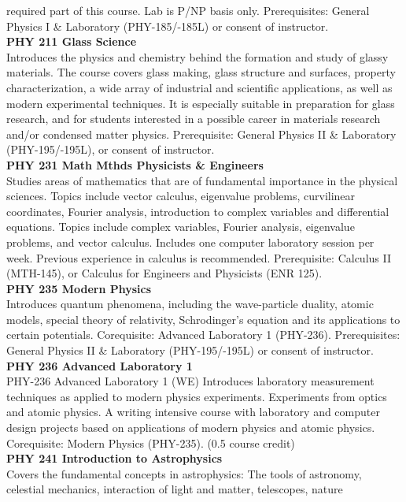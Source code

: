 \documentclass[
  letterpaper,
]{scrbook}
\begin{document}
required part of this course. Lab is P/NP basis only. Prerequisites:
General Physics I \& Laboratory (PHY-185/-185L) or consent of
instructor.\\
\textbf{PHY 211 Glass Science}\\
Introduces the physics and chemistry behind the formation and study of
glassy materials. The course covers glass making, glass structure and
surfaces, property characterization, a wide array of industrial and
scientific applications, as well as modern experimental techniques. It
is especially suitable in preparation for glass research, and for
students interested in a possible career in materials research and/or
condensed matter physics. Prerequisite: General Physics II \& Laboratory
(PHY-195/-195L), or consent of instructor.\\
\textbf{PHY 231 Math Mthds Physicists \& Engineers}\\
Studies areas of mathematics that are of fundamental importance in the
physical sciences. Topics include vector calculus, eigenvalue problems,
curvilinear coordinates, Fourier analysis, introduction to complex
variables and differential equations. Topics include complex variables,
Fourier analysis, eigenvalue problems, and vector calculus. Includes one
computer laboratory session per week. Previous experience in calculus is
recommended. Prerequisite: Calculus II (MTH-145), or Calculus for
Engineers and Physicists (ENR 125).\\
\textbf{PHY 235 Modern Physics}\\
Introduces quantum phenomena, including the wave-particle duality,
atomic models, special theory of relativity, Schrodinger's equation and
its applications to certain potentials. Corequisite: Advanced Laboratory
1 (PHY-236). Prerequisites: General Physics II \& Laboratory
(PHY-195/-195L) or consent of instructor.\\
\textbf{PHY 236 Advanced Laboratory 1}\\
PHY-236 Advanced Laboratory 1 (WE) Introduces laboratory measurement
techniques as applied to modern physics experiments. Experiments from
optics and atomic physics. A writing intensive course with laboratory
and computer design projects based on applications of modern physics and
atomic physics. Corequisite: Modern Physics (PHY-235). (0.5 course
credit)\\
\textbf{PHY 241 Introduction to Astrophysics}\\
Covers the fundamental concepts in astrophysics: The tools of astronomy,
celestial mechanics, interaction of light and matter, telescopes, nature
\end{document}
